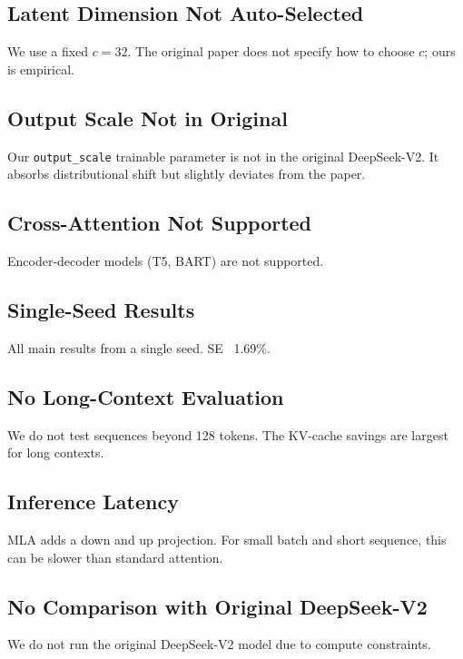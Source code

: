 \subsection{Latent Dimension Not Auto-Selected}

We use a fixed $c = 32$. The original paper does not specify how to 
choose $c$; ours is empirical.

\subsection{Output Scale Not in Original}

Our \texttt{output\_scale} trainable parameter is not in the original DeepSeek-V2. 
It absorbs distributional shift but slightly deviates from the paper.

\subsection{Cross-Attention Not Supported}

Encoder-decoder models (T5, BART) are not supported.

\subsection{Single-Seed Results}

All main results from a single seed. SE ~1.69\%.

\subsection{No Long-Context Evaluation}

We do not test sequences beyond 128 tokens. The KV-cache savings are 
largest for long contexts.

\subsection{Inference Latency}

MLA adds a down and up projection. For small batch and short sequence, this 
can be slower than standard attention.

\subsection{No Comparison with Original DeepSeek-V2}

We do not run the original DeepSeek-V2 model due to compute constraints.

